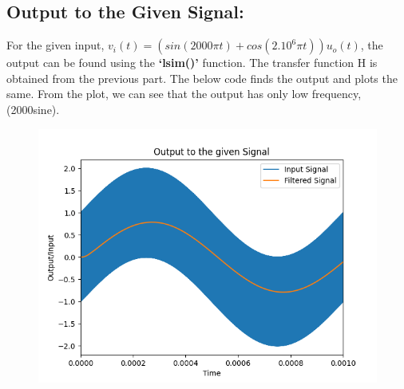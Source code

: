 \documentclass[12pt, a4paper]{report}
\begin{document}
\subsection{Output to the Given Signal:}
For the given input, $v_i(t) = (sin(2000\pi t)+cos(2.10^6\pi t))u_o(t)$, the output can be found using the \textbf{‘lsim()’} function. The transfer function H is obtained from the previous part. The below code finds the output and plots the same. From the plot, we can see that the output has only low frequency, (2000\pi sine).




\begin{figure}[h!]
    \centering
    \includegraphics[scale=0.75]{fig2.png} 
    \caption{}
    \label{fig:my_label}
\end{figure}
\vspace{100mm}
\end{document}
